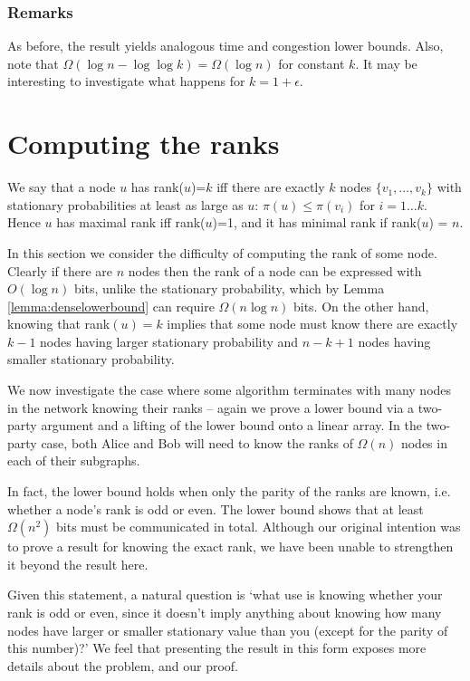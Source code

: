 \documentclass[twocolumn]{article}
\begin{document}
\subsubsection{Remarks}
As before, the result yields analogous time and congestion lower bounds. Also, note that $\Omega(\log n - \log \log k)=\Omega(\log n)$ for constant $k$. It may be interesting to investigate what happens for $k=1+\epsilon$.

\section{Computing the ranks}
\label{section:computing_ranks}
We say that a node $u$ has rank($u$)=$k$ iff there are exactly $k$ nodes $\{v_1,\ldots,v_k\}$ with stationary probabilities at least as large as $u$: $\pi(u) \leq \pi({v_i})$ for $i=1 \ldots k$. Hence $u$ has maximal rank iff rank($u$)=1, and it has minimal rank if rank($u$) = $n$.

In this section we consider the difficulty of computing the rank of some node. Clearly if there are $n$ nodes then the rank of a node can be expressed with $O(\log n)$ bits, unlike the stationary probability, which by Lemma \ref{lemma:denselowerbound} can require $\Omega(n \log n)$ bits. On the other hand, knowing that rank$(u)=k$ implies that some node must know there are exactly $k-1$ nodes having larger stationary probability and $n-k+1$ nodes having smaller stationary probability.



We now investigate the case where some algorithm terminates with many nodes in the network knowing their ranks -- again we prove a lower bound via a two-party argument and a lifting of the lower bound onto a linear array. In the two-party case, both Alice and Bob will need to know the ranks of $\Omega(n)$ nodes in each of their subgraphs.

In fact, the lower bound holds when only the parity of the ranks are known, i.e. whether a node's rank is odd or even. The lower bound shows
that at least $\Omega(n^2)$ bits must be communicated in total. Although our original intention was to prove a result for knowing the exact rank, we have been unable to strengthen it beyond the result here.

Given this statement, a natural question is `what use is knowing whether your rank is odd or even, since it doesn't imply anything
about knowing how many nodes have larger or smaller stationary value than you
(except for the parity of this number)?' We feel that presenting the result in this form exposes more details about the problem, and our proof.
\end{document}
